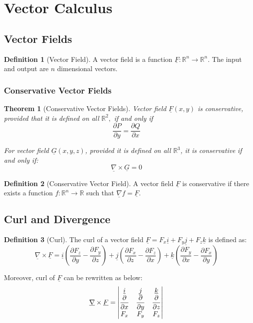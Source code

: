 \documentclass[12pt,a4paper]{article}
\newtheorem{theorem}{Theorem}[subsection]
\theoremstyle{definition}
\newtheorem{definition}{Definition}[section]
\theoremstyle{remark}
\begin{document}
\section{Vector Calculus}

\subsection{Vector Fields}
\begin{definition}[Vector Field]
A vector field is a function 
$\underline{F}: \mathbb{R}^n \rightarrow \mathbb{R}^n$.
The input and output are $n$ dimensional vectors.
\end{definition}

\subsubsection{Conservative Vector Fields}
\begin{theorem}[Conservative Vector Fields]
	Vector field $ \underline{F}(x,y)$
	is conservative, provided that it is defined on all 
	$ \mathbb{R}^2,$ if and only if
	\[
		\frac{\partial P}{\partial y} = \frac{\partial Q}{\partial x}
	\]

For vector field $ \underline{G}(x,y,z)$, provided it is defined on all $ \mathbb{R}^3$, it is conservative if and only if:
\[
	\underline{\nabla} \times \underline{G} = 0
\]

\end{theorem}
\begin{definition}[Conservative Vector Field]
A vector field $\underline{F}$ is conservative if there exists a function $f: \mathbb{R}^n \rightarrow \mathbb{R}$ such that
$\underline{\nabla} f = \underline{F}$.
\end{definition}


\subsection{Curl and Divergence}
\begin{definition}[Curl]
The curl of a vector field $\underline{F} = F_x \underline{i} +  F_y \underline{j} + F_z \underline{k}$ is defined as:
\[
	\underline{\nabla} \times \underline{F} 
	=
	\underline{i}\left( \frac{\partial F_z}{\partial y} - \frac{\partial F_y}{\partial z} \right)
	+ \underline{j}\left( \frac{\partial F_x}{\partial z} - \frac{\partial F_z}{\partial x} \right)
	+ \underline{k}\left( \frac{\partial F_y}{\partial x} - \frac{\partial F_x}{\partial y} \right)
\]

Moreover, curl of $ \underline{F}$ can be rewritten as below:
\[
	\underline{\nabla} \times \underline{F} = 
	\begin{vmatrix}
		\underline{i} & \strut\underline{j} & \underline{k} \\
		\dfrac{\partial}{\partial x} & \dfrac{\partial}{\partial y} & \dfrac{\partial}{\partial z} \\
		F_x & F_y & F_z
	\end{vmatrix}
\]
\end{definition}
\end{document}
